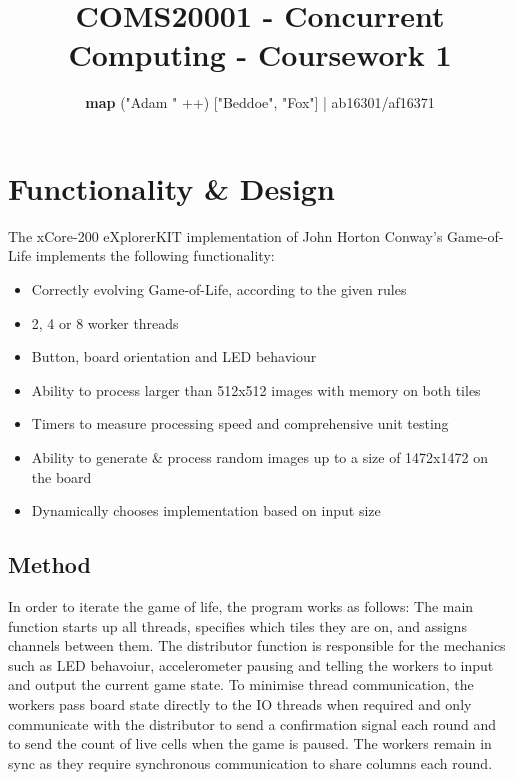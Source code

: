 \documentclass[11pt, oneside]{article}
\title{COMS20001 - Concurrent Computing - Coursework 1}
\author{\textbf{map} ("Adam " ++) ["Beddoe", "Fox"]   |  ab16301/af16371 }
\date{\vspace{-5mm}}
\begin{document}
\maketitle

\section{Functionality \& Design}
The xCore-200 eXplorerKIT implementation of John Horton Conway's Game-of-Life implements the following functionality:

\begin{itemize}
\setlength\itemsep{-2mm}
	\item Correctly evolving Game-of-Life, according to the given rules
	\item 2, 4 or 8 worker threads
	\item Button, board orientation and LED behaviour
	\item Ability to process larger than 512x512 images with memory on both tiles
	\item Timers to measure processing speed and comprehensive unit testing
	\item Ability to generate \& process random images up to a size of 1472x1472 on the board
        \item Dynamically chooses implementation based on input size
\end{itemize}

\vspace{-4mm}
\subsection{Method}
\vspace{-2mm}
In order to iterate the game of life, the program works as follows: The main function starts up all threads, specifies which tiles they are on, and assigns channels between them. The distributor function is responsible for the mechanics such as LED behavoiur, accelerometer pausing and telling the workers to input and output the current game state. To minimise thread communication, the workers pass board state directly to the IO threads when required and only communicate with the distributor to send a confirmation signal each round and to send the count of live cells when the game is paused. The workers remain in sync as they require synchronous communication to share columns each round.


\vspace{-4mm}
\end{document}
